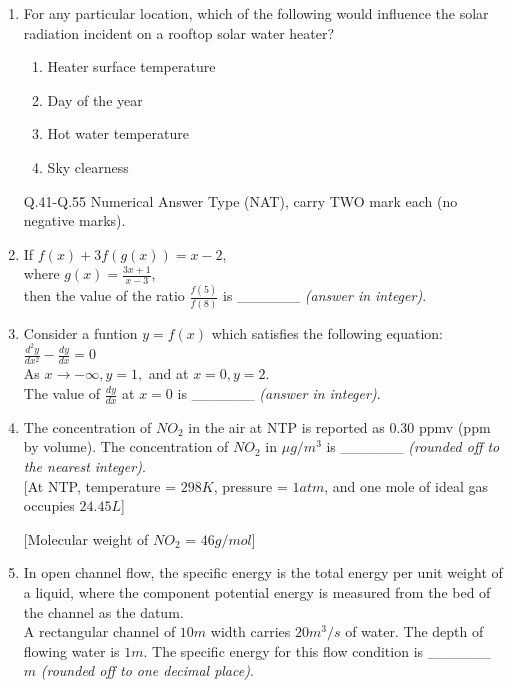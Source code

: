 \documentclass[journal]{IEEEtran}
\begin{document}
\begin{enumerate}[start=1]
\item For any particular location, which of the following would influence the solar radiation incident on a rooftop solar water heater? \hfill{}
\begin{enumerate}
    \item Heater surface temperature
    \item Day of the year
    \item Hot water temperature
    \item Sky clearness
\end{enumerate}
\bigskip 

Q.41-Q.55 Numerical Answer Type (NAT), carry TWO mark each (no negative marks). \\

\item If $f(x) + 3f(g(x))=x-2$, \\ where $g(x)=\frac{3x+1}{x-3}$, \\ then the value of the ratio $\frac{f(5)}{f(8)}$ is \_\_\_\_\_\_ \textit{(answer in integer)}. \hfill{}

\item Consider a funtion $y=f(x)$ which satisfies the following equation:\\ $\frac{d^2y}{dx^2}-\frac{dy}{dx}=0$\\ As $x\to-\infty, y=1,$ and at $x=0,y=2$.\\ The value of $\frac{dy}{dx}$ at $x=0$ is \_\_\_\_\_\_ \textit{(answer in integer)}. \hfill{}

\item The concentration of $NO_2$ in the air at NTP is reported as 0.30 ppmv (ppm by volume). The concentration of $NO_2$ in $\mu g/m^3$ is \_\_\_\_\_\_ \textit{(rounded off to the nearest integer)}.\\

[At NTP, temperature = $298K$, pressure = $1 atm$, and one mole of ideal gas occupies $24.45 L$]

[Molecular weight of $NO_2$ = $46 g/mol$] \hfill{}

\item In open channel flow, the specific energy is the total energy per unit weight of a liquid, where the component potential energy is measured from the bed of the channel as the datum.\\
A rectangular channel of $10m$ width carries $20 m^3/s$ of water. The depth of flowing water is $1 m$. The specific energy for this flow condition is \_\_\_\_\_\_ $m$ \textit{(rounded off to one decimal place)}.\\ 


\end{enumerate}
\end{document}
